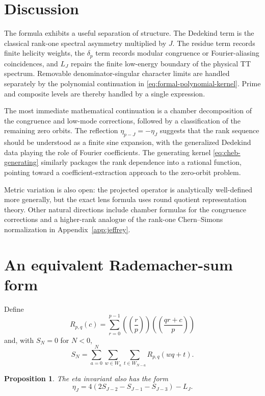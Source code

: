 \documentclass[11pt]{article}
\newtheorem{proposition}[theorem]{Proposition}
\theoremstyle{definition}
\begin{document}
\section{Discussion}

The formula exhibits a useful separation of structure.  The Dedekind term is
the classical rank-one spectral asymmetry multiplied by $J$.  The residue
term records finite helicity weights, the $\delta_p$ term records modular
congruence or Fourier-aliasing coincidences, and $L_J$ repairs the finite
low-energy boundary of the physical TT spectrum.  Removable
denominator-singular character limits are handled separately by the
polynomial continuation in \eqref{eq:formal-polynomial-kernel}.  Prime and
composite levels are thereby handled by a single expression.

The most immediate mathematical continuation is a chamber decomposition of
the congruence and low-mode corrections, followed by a classification of the
remaining zero orbits.  The reflection $\eta_{p-J}=-\eta_J$ suggests that the
rank sequence should be understood as a finite sine expansion, with the
generalized Dedekind data playing the role of Fourier coefficients.  The
generating kernel \eqref{eq:cheb-generating} similarly packages the rank
dependence into a rational function, pointing toward a coefficient-extraction
approach to the zero-orbit problem.

Metric variation is also open: the projected operator is analytically
well-defined more generally, but the exact lens formula uses round quotient
representation theory.  Other natural directions include chamber formulas
for the congruence corrections and a higher-rank analogue of the rank-one
Chern--Simons normalization in Appendix~\ref{app:jeffrey}.

\appendix

\section{An equivalent Rademacher-sum form}
\label{app:rademacher}

Define
\[
 R_{p,q}(c)=\sum_{r=0}^{p-1}
 \left(\!\left(\frac rp\right)\!\right)
 \left(\!\left(\frac{qr+c}{p}\right)\!\right)
\]
and, with $S_N=0$ for $N<0$,
\[
 S_N=\sum_{a=0}^N\sum_{w\in W_a}\sum_{t\in W_{N-a}}
 R_{p,q}(wq+t).
\]

\begin{proposition}\label{prop:rademacher-form}
The eta invariant also has the form
\begin{equation}
 \eta_J=4(2S_{J-2}-S_{J-1}-S_{J-3})-L_J.
 \label{eq:rademacher-form}
\end{equation}
\end{proposition}
\end{document}
